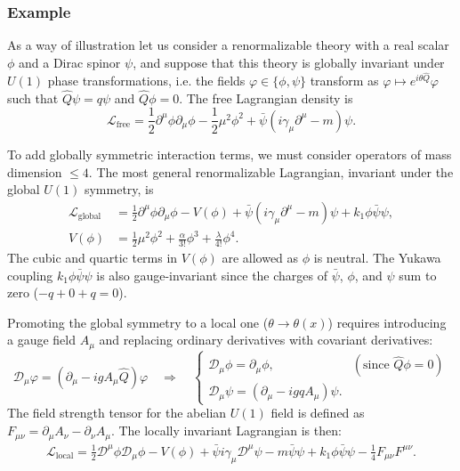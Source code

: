 \subsubsection{Example}
As a way of illustration let us consider a renormalizable theory with a real scalar $\phi$ and a Dirac spinor $\psi$, and suppose that this theory is globally invariant under $U(1)$ phase transformations, i.e. the fields $\varphi\in\{\phi,\psi\}$ transform as $\varphi\mapsto e^{i\theta \hat Q}\varphi $ such that $\hat Q \psi = q \psi$ and $\hat Q \phi=0$. The free Lagrangian density is
\begin{equation}
	\mathcal L_{\text{free}}=\frac{1}{2} \partial^{\mu} \phi \partial_{\mu} \phi-\frac{1}{2}\mu^2\phi^2+\bar{\psi}(i \gamma_\mu  \partial^\mu-m) \psi.
\end{equation}

To add globally symmetric interaction terms, we must consider operators of mass dimension $\leq 4$. The most general renormalizable Lagrangian, invariant under the global $U(1)$ symmetry, is
\begin{equation}
	\begin{aligned}
		\mathcal L_{\text{global}}&=\frac{1}{2} \partial^{\mu} \phi \partial_{\mu} \phi-V(\phi)+\bar{\psi}(i \gamma_\mu  \partial^\mu-m) \psi + k_1 \phi\bar\psi\psi,
		\\
		V(\phi)&=\frac{1}{2}\mu^2\phi^2 +\frac{\alpha}{3!}\phi^3+\frac{\lambda}{4!}\phi^4.
	\end{aligned}
\end{equation}
The cubic and quartic terms in $V(\phi)$ are allowed as $\phi$ is neutral. The Yukawa coupling $k_1 \phi\bar\psi\psi$ is also gauge-invariant since the charges of $\bar\psi$, $\phi$, and $\psi$ sum to zero ($-q + 0 + q = 0$).

Promoting the global symmetry to a local one ($\theta \to \theta(x)$) requires introducing a gauge field $A_\mu$ and replacing ordinary derivatives with covariant derivatives:
\begin{equation}
	\mathcal D_\mu\varphi=(\partial_{\mu}-i g A_\mu\hat Q )\varphi
	\quad\Longrightarrow\quad
	\begin{cases}
		\mathcal D_\mu\phi=\partial_\mu \phi, & (\text{since } \hat Q\phi=0)\\
		\mathcal D_\mu\psi=(\partial_\mu - i g q A_\mu) \psi.
	\end{cases}
\end{equation}
The field strength tensor for the abelian $U(1)$ field is defined as $F_{\mu\nu} = \partial_\mu A_\nu - \partial_\nu A_\mu$. The locally invariant Lagrangian is then:
\begin{multline}
	\mathcal L_{\text{local}}=\frac{1}{2} \mathcal D^{\mu} \phi \mathcal D_{\mu} \phi-V(\phi)
	+\bar{\psi}i \gamma_\mu  \mathcal D^{\mu} \psi - m \bar{\psi}\psi
	+ k_1 \phi\bar\psi\psi-\frac{1}{4} F_{\mu\nu}F^{\mu\nu}.
\end{multline}


